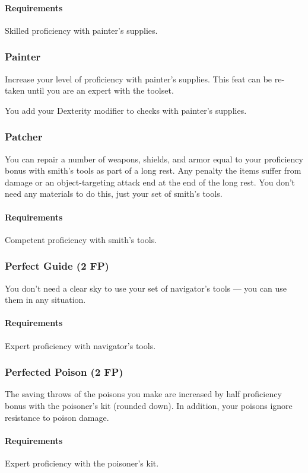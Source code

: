     \paragraph{Requirements} Skilled proficiency with painter's supplies.
\subsubsection{Painter} \label{feat::painter}
    Increase your level of proficiency with painter's supplies.
    This feat can be re-taken until you are an expert with the toolset.

    You add your Dexterity modifier to checks with painter's supplies.
\subsubsection{Patcher} \label{feat::patcher}
    You can repair a number of weapons, shields, and armor equal to your proficiency bonus with smith's tools as part of a long rest.
    Any penalty the items suffer from damage or an object-targeting attack end at the end of the long rest.
    You don't need any materials to do this, just your set of smith's tools.
    \paragraph{Requirements} Competent proficiency with smith's tools.
\subsubsection{Perfect Guide (2 FP)} \label{feat::perfectguide}
    You don't need a clear sky to use your set of navigator's tools --- you can use them in any situation.
    \paragraph{Requirements} Expert proficiency with navigator's tools.
\subsubsection{Perfected Poison (2 FP)} \label{feat::perfectedpoison}
    The saving throws of the poisons you make are increased by half proficiency bonus with the poisoner's kit (rounded down).
    In addition, your poisons ignore resistance to poison damage.
    \paragraph{Requirements} Expert proficiency with the poisoner's kit.
